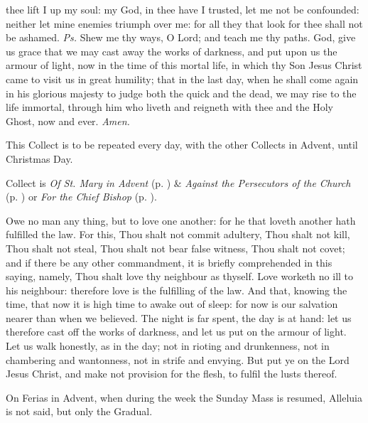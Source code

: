 \introit
{} thee lift I up my soul: my God, in thee have I trusted, let me not be confounded: neither let mine enemies triumph over me: for all they that look for thee shall not be ashamed. \textit{Ps.} Shew me thy ways, O Lord; and teach me thy paths.
\collect\label{AdventICollect}
 God, give us grace that we may cast away the works of darkness, and put upon us the armour of light, now in the time of this mortal life, in which thy Son Jesus Christ came to visit us in great humility; that in the last day, when he shall come again in his glorious majesty to judge both the quick and the dead, we may rise to the life immortal, through him who liveth and reigneth with thee and the Holy Ghost, now and ever. \textit{Amen.}
\begin{rubric}
    This Collect is to be repeated every day, with the other Collects in Advent, until Christmas Day.
\end{rubric}
\begin{rubric}
     Collect is \emph{Of St. Mary in Advent} (p. \pageref{SPMaryInAdvent}) \&  \emph{Against the Persecutors of the Church} (p. \pageref{SPAgainst}) or \emph{For the Chief Bishop} (p. \pageref{SPChiefBishop}).
\end{rubric}
 Owe no man any thing, but to love one another: for he that loveth another hath fulfilled the law. For this, Thou shalt not commit adultery, Thou shalt not kill, Thou shalt not steal, Thou shalt not bear false witness, Thou shalt not covet; and if there be any other commandment, it is briefly comprehended in this saying, namely, Thou shalt love thy neighbour as thyself. Love worketh no ill to his neighbour: therefore love is the fulfilling of the law. And that, knowing the time, that now it is high time to awake out of sleep: for now is our salvation nearer than when we believed. The night is far spent, the day is at hand: let us therefore cast off the works of darkness, and let us put on the armour of light. Let us walk honestly, as in the day; not in rioting and drunkenness, not in chambering and wantonness, not in strife and envying. But put ye on the Lord Jesus Christ, and make not provision for the flesh, to fulfil the lusts thereof.
\begin{rubric}
    On Ferias in Advent, when during the week the Sunday Mass is resumed, Alleluia is not said, but only the Gradual.
\end{rubric}

